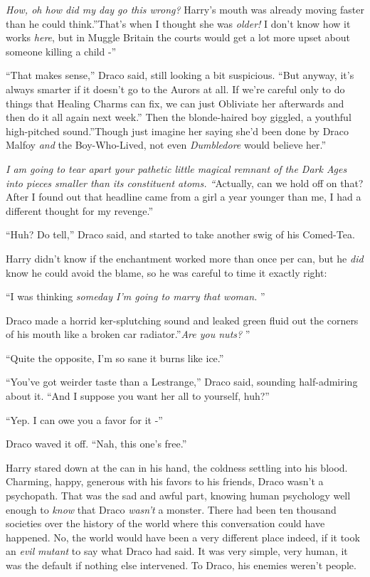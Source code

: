 \emph{How, oh how did my day go this wrong?} Harry's mouth was already
moving faster than he could think.''That's when I thought she was
\emph{older!} I don't know how it works \emph{here}, but in Muggle
Britain the courts would get a lot more upset about someone killing a
child -''

``That makes sense,'' Draco said, still looking a bit suspicious. ``But
anyway, it's always smarter if it doesn't go to the Aurors at all. If
we're careful only to do things that Healing Charms can fix, we can just
Obliviate her afterwards and then do it all again next week.'' Then the
blonde-haired boy giggled, a youthful high-pitched sound.''Though just
imagine her saying she'd been done by Draco Malfoy \emph{and} the
Boy-Who-Lived, not even \emph{Dumbledore} would believe her.''

\emph{I am going to tear apart your pathetic little magical remnant of
the Dark Ages into pieces smaller than its constituent atoms.
``}Actually, can we hold off on that? After I found out that headline
came from a girl a year younger than me, I had a different thought for
my revenge.''

``Huh? Do tell,'' Draco said, and started to take another swig of his
Comed-Tea.

Harry didn't know if the enchantment worked more than once per can, but
he \emph{did} know he could avoid the blame, so he was careful to time
it exactly right:

``I was thinking \emph{someday I'm going to marry that woman.} ''

Draco made a horrid ker-splutching sound and leaked green fluid out the
corners of his mouth like a broken car radiator.''\emph{Are you nuts?} ''

``Quite the opposite, I'm so sane it burns like ice.''

``You've got weirder taste than a Lestrange,'' Draco said, sounding
half-admiring about it. ``And I suppose you want her all to yourself,
huh?''

``Yep. I can owe you a favor for it -''

Draco waved it off. ``Nah, this one's free.''

Harry stared down at the can in his hand, the coldness settling into his
blood. Charming, happy, generous with his favors to his friends, Draco
wasn't a psychopath. That was the sad and awful part, knowing human
psychology well enough to \emph{know} that Draco \emph{wasn't} a
monster. There had been ten thousand societies over the history of the
world where this conversation could have happened. No, the world would
have been a very different place indeed, if it took an \emph{evil}
\emph{mutant} to say what Draco had said. It was very simple, very
human, it was the default if nothing else intervened. To Draco, his
enemies weren't people.

